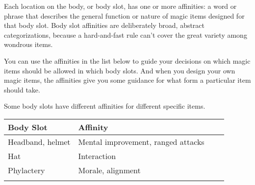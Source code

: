 Each location on the body, or body slot, has one or more affinities: a word or 
phrase that describes the general function or nature of magic items designed for 
that body slot. Body slot affinities are deliberately broad, abstract categorizations, 
because a hard-and-fast rule can't cover the great variety among wondrous items.

You can use the affinities in the list below to guide your decisions on which magic 
items should be allowed in which body slots. And when you design your own magic 
items, the affinities give you some guidance for what form a particular item should 
take.

Some body slots have different affinities for different specific items. 

\begin{longtable}{llll}
\hline
\multicolumn{1}{|p{1.700in}|}{\begin{minipage}[t]{1.700in}\raggedright
\textbf{Body Slot}\end{minipage}} & \multicolumn{1}{p{2.256in}|}{\begin{minipage}[t]{2.256in}\raggedright
\textbf{Affinity}\end{minipage}}\\
\hline
\multicolumn{1}{p{0.069in}|}{\begin{minipage}[t]{0.069in}\raggedright
Headband, helmet\end{minipage}} & \multicolumn{1}{p{0.069in}|}{\begin{minipage}[t]{0.069in}\raggedright
Mental improvement, ranged attacks\end{minipage}}\\
\hline
\multicolumn{1}{|p{1.700in}|}{\begin{minipage}[t]{1.700in}\raggedright
Hat\end{minipage}} & \multicolumn{1}{p{2.256in}|}{\begin{minipage}[t]{2.256in}\raggedright
Interaction\end{minipage}}\\
\hline
\multicolumn{1}{p{0.069in}|}{\begin{minipage}[t]{0.069in}\raggedright
Phylactery\end{minipage}} & \multicolumn{1}{p{0.069in}|}{\begin{minipage}[t]{0.069in}\raggedright
Morale, alignment\end{minipage}}\\
\hline
\multicolumn{1}{|p{1.700in}|}{\begin{minipage}[t]{1.700in}\raggedright

\end{minipage}}
\end{longtable}
